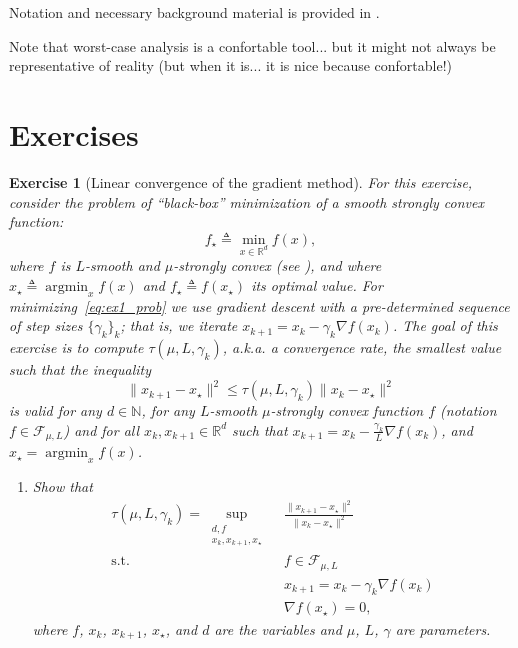 \documentclass[11pt,a4paper]{article}
\DeclareMathOperator*{\argmin}{argmin}
\newtheorem{exercise}{Exercise}
\begin{document}
	Notation and necessary background material is provided in .
	
	Note that worst-case analysis is a confortable tool... but it might not always be representative of reality (but when it is... it is nice because confortable!)
	

	
	\section{Exercises}			%
	
	\begin{exercise}[Linear convergence of the gradient method] For this exercise, consider the problem of ``black-box'' minimization of a smooth strongly convex function:
	\begin{equation}\label{eq:ex1_prob}
	f_\star \triangleq \min_{x\in\mathbb{R}^d} f(x),
	\end{equation}
	where $f$ is $L$-smooth and $\mu$-strongly convex (see ), and where $x_\star\triangleq \argmin_{x} f(x)$ and $f_\star\triangleq f(x_\star)$ its optimal value. For minimizing~\eqref{eq:ex1_prob} we use gradient descent with a pre-determined sequence of step sizes $\{\gamma_k\}_k$; that is, we iterate $x_{k+1}=x_k-\gamma_k \nabla f(x_k)$.
	The goal of this exercise is to compute $\tau(\mu,L,\gamma_k)$, a.k.a.\! a convergence rate, the smallest value such that the inequality
	\[ \|x_{k+1}-x_\star\|^2 \leqslant \tau(\mu,L,\gamma_k) \|x_k-x_\star\|^2\]
	is valid for any $d\in\mathbb{N}$, for any $L$-smooth $\mu$-strongly convex function $f$ (notation $f\in\mathcal{F}_{\mu,L}$) and for all $x_k,x_{k+1}\in\mathbb{R}^d$ such that $x_{k+1}=x_k-\frac{\gamma_k}{L} \nabla f(x_k)$, and $x_\star=\argmin_x f(x)$. 
	\begin{enumerate}
	\item Show that 
	\begin{align*}
		\tau(\mu,L,\gamma_k)= \sup_{\substack{d,f\\x_k,x_{k+1},x_\star}} \ &\frac{\|x_{k+1}-x_\star\|^2}{\|x_k-x_\star\|^2}\\
		\text{s.t. } & f\in\mathcal{F}_{\mu,L} \\
		&x_{k+1}=x_k-\gamma_k  \nabla f(x_k)\\
		&\nabla f(x_\star)=0,
		\end{align*} where $f$, $x_k$, $x_{k+1}$, $x_\star$, and $d$ are the variables and $\mu$, $L$, $\gamma$ are parameters.
		

\end{enumerate}
\end{exercise}
\end{document}
